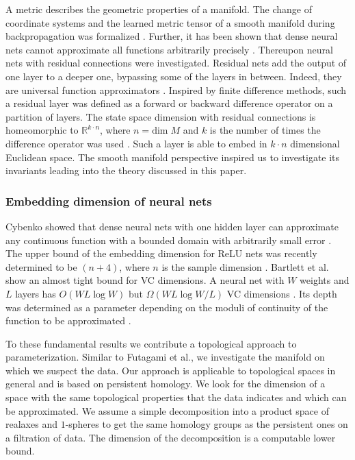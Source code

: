 \documentclass[runningheads,orivec]{llncs}
\begin{document}
A metric describes the geometric properties of a manifold. The change of coordinate systems and the learned metric tensor of a smooth manifold during backpropagation was formalized \cite{HauserR17}. Further, it has been shown that dense neural nets cannot approximate all functions arbitrarily precisely \cite{Johnson19}. Thereupon neural nets with residual connections were investigated. Residual nets add the output of one layer to a deeper one, bypassing some of the layers in between. Indeed, they are universal function approximators \cite{LinJ18}. Inspired by finite difference methods, such a residual layer was defined as a forward or backward difference operator on a partition of layers. The state space dimension with residual connections is homeomorphic to $\mathbb{R}^{k \cdot n}$, where $n = \text{dim} \; M$ and $k$ is the number of times the difference operator was used \cite{HauserGJR19}. Such a layer is able to embed in $k\cdot n$ dimensional Euclidean space. The smooth manifold perspective inspired us to investigate its invariants leading into the theory discussed in this paper.

\subsubsection*{Embedding dimension of neural nets} Cybenko showed that dense neural nets with one hidden layer can approximate any continuous function with a bounded domain with arbitrarily small error \cite{Cybenko92}. The upper bound of the embedding dimension for ReLU nets was recently determined to be $(n+4)$, where $n$ is the sample dimension \cite{RaghuPKGS17}. Bartlett et al. show an almost tight bound for VC dimensions. A neural net with $W$ weights and $L$ layers has $O(WL \log W)$ but $\Omega(WL \log W/L)$ VC dimensions \cite{BartlettHLM19}. Its depth was determined as a parameter depending on the moduli of continuity of the function to be approximated \cite{LinJ18}. 

To these fundamental results we contribute a topological approach to parameterization. Similar to Futagami et al.\cite{FutagamiYS19}, we investigate the manifold on which we suspect the data. Our approach is applicable to topological spaces in general and is based on persistent homology. We look for the dimension of a space with the same topological properties that the data indicates and which can be approximated. We assume a simple decomposition into a product space of realaxes and $1$-spheres to get the same homology groups as the persistent ones on a filtration of data. The dimension of the decomposition is a computable lower bound.
\end{document}
